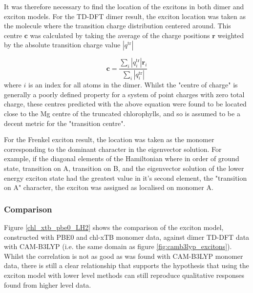 It was therefore necessary to find the location of the excitons in both dimer and
exciton models. For the TD-DFT dimer result, the exciton location was taken as the
molecule where the transition charge distribution centered around. This centre
$\mathbf{c}$ was calculated by taking the average of the charge positions $\mathbf{r}$
weighted by the absolute transition charge value $\left\lvert q^{\text{tr}} \right\rvert$

\begin{equation}
    \mathbf{c} = \frac{\sum_i \left\lvert q^{\text{tr}}_i \right\rvert \mathbf{r}_i}{\sum_i \left\lvert q^{\text{tr}}_i \right\rvert}
\end{equation}
%
where $i$ is an index for all atoms in the dimer. Whilst the "centre of charge"
is generally a poorly defined property for a system of point charges with zero total
charge, these centres predicted with the above equation were found to be located close
to the Mg centre of the truncated chlorophylls, and so is assumed to be a decent
metric for the "transition centre".

For the Frenkel exciton result, the location was taken as the monomer corresponding
to the dominant character in the eigenvector solution. For example, if the diagonal
elements of the Hamiltonian where in order of ground state, transition on A, transition
on B, and the eigenvector solution of the lower energy exciton state had the greatest
value in it's second element, the "transition on A" character, the exciton was assigned
as localised on monomer A.

\subsubsection{Comparison}
\label{subsec:state_assign}

Figure \ref{chl_xtb_pbe0_LH2} shows the comparison of the exciton model, constructed
with PBE0 and chl-xTB monomer data, against dimer TD-DFT data with CAM-B3LYP (i.e.
the same domain as figure \ref{fig:camb3lyp_excitons}). Whilst the correlation is 
not as good as was found with CAM-B3LYP monomer data, there is still a clear relationship 
that supports the hypothesis that using the exciton model with lower level methods 
can still reproduce qualitative responses found from higher level data.

